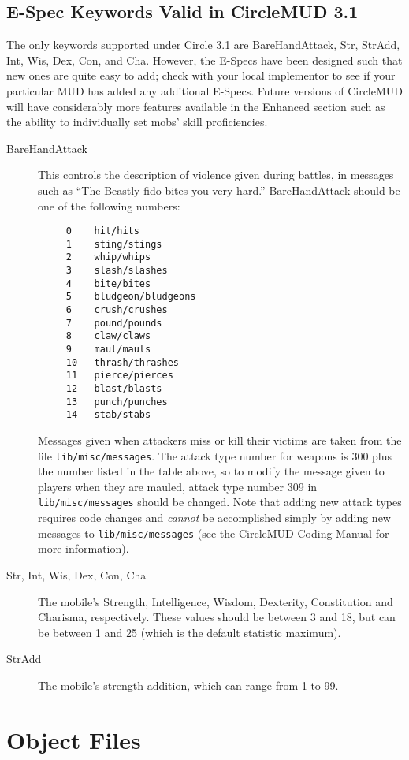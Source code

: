\documentclass[11pt]{article}
\begin{document}
\subsection{E-Spec Keywords Valid in CircleMUD 3.1}
The only keywords supported under Circle 3.1 are BareHandAttack, Str, StrAdd, Int, Wis, Dex, Con, and Cha.  However, the E-Specs have been designed such that new ones are quite easy to add; check with your local implementor to see if your particular MUD has added any additional E-Specs.  Future versions of CircleMUD will have considerably more features available in the Enhanced section such as the ability to individually set mobs' skill proficiencies.
\begin{description}
\item[BareHandAttack] This controls the description of violence given during battles, in messages such as ``The Beastly fido bites you very hard.''  BareHandAttack should be one of the following numbers:
\begin{verbatim}
     0    hit/hits
     1    sting/stings
     2    whip/whips
     3    slash/slashes
     4    bite/bites
     5    bludgeon/bludgeons
     6    crush/crushes
     7    pound/pounds
     8    claw/claws
     9    maul/mauls
     10   thrash/thrashes
     11   pierce/pierces
     12   blast/blasts
     13   punch/punches
     14   stab/stabs
\end{verbatim}
Messages given when attackers miss or kill their victims are taken from the file \texttt{lib/misc/messages}. The attack type number for weapons is 300 plus the number listed in the table above, so to modify the message given to players when they are mauled, attack type number 309 in \texttt{lib/misc/messages} should be changed.  Note that adding new attack types requires code changes and {\em cannot} be accomplished simply by adding new messages to \texttt{lib/misc/messages} (see the CircleMUD Coding Manual for more information).
\item[Str, Int, Wis, Dex, Con, Cha] The mobile's Strength, Intelligence, Wisdom, Dexterity, Constitution and Charisma, respectively.  These values should be between 3 and 18, but can be between 1 and 25 (which is the default statistic maximum).
\item[StrAdd] The mobile's strength addition, which can range from 1 to 99.
\end{description}

\section{Object Files}
\end{document}
